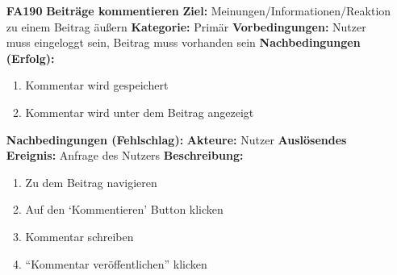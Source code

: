 \documentclass[parskip=full]{scrartcl}
\begin{document}
\begin{itemize}[nosep]
				
			\item[\textbf{FA190}]\textbf{Beiträge kommentieren}
				\newline \textbf{Ziel:} Meinungen/Informationen/Reaktion zu einem Beitrag äußern
				\newline \textbf{Kategorie:} Primär
				\newline \textbf{Vorbedingungen:} Nutzer muss eingeloggt sein, Beitrag muss vorhanden sein
				\newline \textbf{Nachbedingungen (Erfolg):} 
				\begin{enumerate}[nosep]
					\item Kommentar wird gespeichert
					\item Kommentar wird unter dem Beitrag angezeigt 
				\end{enumerate}
				\textbf{Nachbedingungen (Fehlschlag):}
				\newline \textbf{Akteure:} Nutzer
				\newline \textbf{Auslösendes Ereignis:} Anfrage des Nutzers
				\newline \textbf{Beschreibung:}
				\begin{enumerate}[nosep]
					\item Zu dem Beitrag navigieren
					\item Auf den ‘Kommentieren’ Button klicken
					\item Kommentar schreiben
					\item “Kommentar veröffentlichen” klicken\\
				\end{enumerate}
			

\end{itemize}
\end{document}
